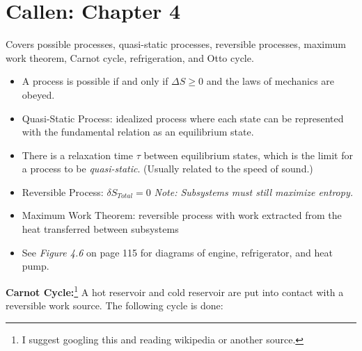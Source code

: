 \section{Callen: Chapter 4}
Covers possible processes, quasi-static processes, reversible processes, maximum work theorem, Carnot cycle, refrigeration, and Otto cycle.

\begin{itemize}
    \item A process is possible if and only if $\Delta S \geq 0$ and the laws of mechanics are obeyed.
    \item Quasi-Static Process: idealized process where each state can be represented with the fundamental relation as an equilibrium state.
    \item There is a relaxation time $\tau$ between equilibrium states, which is the limit for a process to be \emph{quasi-static}. (Usually related to the speed of sound.)
    \item Reversible Process: $\delta S_{Total}=0$ \emph{Note: Subsystems must still maximize entropy.}
    \item Maximum Work Theorem: reversible process with work extracted from the heat transferred between subsystems
    \item See \emph{Figure 4.6} on page 115 for diagrams of engine, refrigerator, and heat pump.
\end{itemize}

\textbf{Carnot Cycle:}\footnote{I suggest googling this and reading wikipedia or another source.} A hot reservoir and cold reservoir are put into contact with a reversible work source. The following cycle is done:

